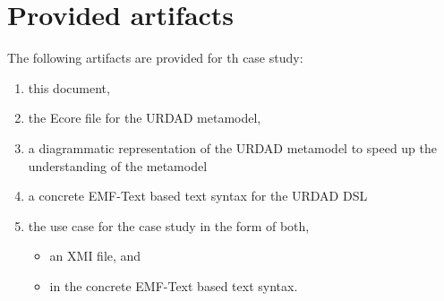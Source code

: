 \section{Provided artifacts}

The following artifacts are provided for th case study:
\begin{enumerate}
  \item this document,
  \item the Ecore file for the URDAD metamodel,
  \item a diagrammatic representation of the URDAD metamodel to speed up the understanding of the metamodel
  \item a concrete EMF-Text based text syntax for the URDAD DSL
  \item the use case for the case study in the form of both, 
    \begin{itemize}
     \item an XMI file, and
     \item in the concrete EMF-Text based text syntax.
    \end{itemize}
\end{enumerate}
